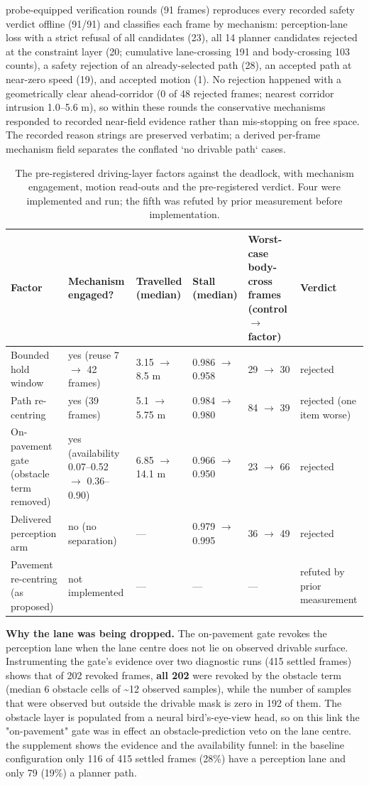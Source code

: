 \documentclass[journal]{IEEEtran}
\begin{document}
probe-equipped verification rounds (91 frames) reproduces every recorded safety verdict offline (91/91)
and classifies each frame by mechanism: perception-lane loss with a strict refusal of all candidates (23),
all 14 planner candidates rejected at the constraint layer (20; cumulative lane-crossing 191 and
body-crossing 103 counts), a safety rejection of an already-selected path (28), an accepted path at
near-zero speed (19), and accepted motion (1). No rejection happened with a geometrically clear
ahead-corridor (0 of 48 rejected frames; nearest corridor intrusion 1.0--5.6 m), so within these rounds
the conservative mechanisms responded to recorded near-field evidence rather than mis-stopping on free
space. The recorded reason strings are preserved verbatim; a derived per-frame mechanism field
separates the conflated `no drivable path` cases.
\begin{table}[!t]
\centering
\caption{The pre-registered driving-layer factors against the deadlock, with mechanism engagement,
motion read-outs and the pre-registered verdict. Four were implemented and run; the fifth was refuted by
prior measurement before implementation.}
\begin{tabular}{@{}llllll@{}}
\toprule
Factor & Mechanism engaged? & Travelled (median) & Stall (median) & Worst-case body-cross frames (control $\rightarrow$ factor) & Verdict \\
\midrule
Bounded hold window & yes (reuse 7 $\rightarrow$ 42 frames) & 3.15 $\rightarrow$ 8.5 m & 0.986 $\rightarrow$ 0.958 & 29 $\rightarrow$ 30 & rejected \\
Path re-centring & yes (39 frames) & 5.1 $\rightarrow$ 5.75 m & 0.984 $\rightarrow$ 0.980 & 84 $\rightarrow$ 39 & rejected (one item worse) \\
On-pavement gate (obstacle term removed) & yes (availability 0.07--0.52 $\rightarrow$ 0.36--0.90) & 6.85 $\rightarrow$ 14.1 m & 0.966 $\rightarrow$ 0.950 & 23 $\rightarrow$ 66 & rejected \\
Delivered perception arm & no (no separation) & --- & 0.979 $\rightarrow$ 0.995 & 36 $\rightarrow$ 49 & rejected \\
Pavement re-centring (as proposed) & not implemented & --- & --- & --- & refuted by prior measurement \\
\bottomrule
\end{tabular}
\end{table}
\textbf{Why the lane was being dropped.} The on-pavement gate revokes the perception lane when the lane
centre does not lie on observed drivable surface. Instrumenting the gate's evidence over two
diagnostic runs (415 settled frames) shows that of 202 revoked frames, \textbf{all 202} were revoked by the
obstacle term (median 6 obstacle cells of \textasciitilde{}12 observed samples), while the number of samples that
were observed but outside the drivable mask is zero in 192 of them. The obstacle layer is populated
from a neural bird's-eye-view head, so on this link the "on-pavement" gate was in effect an
obstacle-prediction veto on the lane centre. the supplement shows the evidence and the availability funnel:
in the baseline configuration only 116 of 415 settled frames (28\%) have a perception lane and only
79 (19\%) a planner path.
\end{document}
